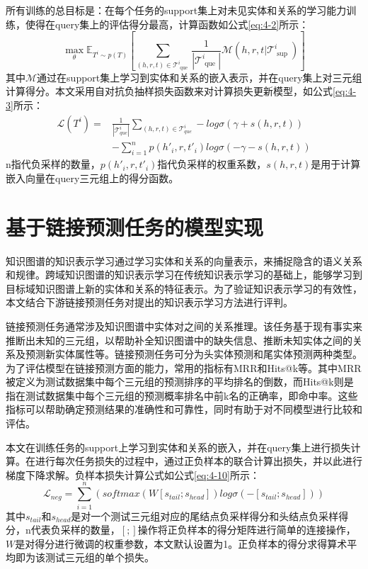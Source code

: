 所有训练的总目标是：在每个任务的support集上对未见实体和关系的学习能力训练，使得在query集上的评估得分最高，计算函数如公式\ref{eq:4-2}所示：
\begin{equation}
  \max\limits_{ \theta } \mathbb{E} _ { T ^ { i } \sim p ( T ) } \left[ \sum\limits_{ ( h , r , t ) \in \mathcal{T} _ { \text { que } } ^ { i } } \frac { 1 } { | \mathcal{T} _ { \text { que } } ^ { i } | } \mathcal{M} ( h , r , t | \mathcal{T} _ { \text { sup } } ^ { i } ) \right] \label{eq:4-2}
\end{equation}
其中\(\mathcal{M}\)通过在support集上学习到实体和关系的嵌入表示，并在query集上对三元组计算得分。本文采用自对抗负抽样损失函数来对计算损失更新模型，如公式\ref{eq:4-3}所示：
\begin{equation}
  \begin{aligned}
    \mathcal{L}(T^{i}) = &\frac{1}{|\mathcal{T}^{i}_{que}|} \sum\limits_{(h,r,t)\in\mathcal{T}^{i}_{que}}-log\sigma(\gamma + s(h,r,t)) \\
    &-\sum\limits_{i=1}^{n}p(h'_{i},r,t'_{i})log\sigma(-\gamma - s(h,r,t)) \label{eq:4-3}
  \end{aligned}
\end{equation}
n指代负采样的数量，\(p(h'_{i},r,t'_{i})\)指代负采样的权重系数，\(s(h,r,t)\)是用于计算嵌入向量在query三元组上的得分函数。

\section{基于链接预测任务的模型实现}
知识图谱的知识表示学习通过学习实体和关系的向量表示，来捕捉隐含的语义关系和规律。跨域知识图谱的知识表示学习在传统知识表示学习的基础上，能够学习到目标域知识图谱上新的实体和关系的特征表示。为了验证知识表示学习的有效性，本文结合下游链接预测任务对提出的知识表示学习方法进行评判。

链接预测任务通常涉及知识图谱中实体对之间的关系推理。该任务基于现有事实来推断出未知的三元组，以帮助补全知识图谱中的缺失信息、推断未知实体之间的关系及预测新实体属性等。链接预测任务可分为头实体预测和尾实体预测两种类型。为了评估模型在链接预测方面的能力，常用的指标有MRR和Hits@k等。其中MRR被定义为测试数据集中每个三元组的预测排序的平均排名的倒数，而Hits@k则是指在测试数据集中每个三元组的预测概率排名中前k名的正确率，即命中率。这些指标可以帮助确定预测结果的准确性和可靠性，同时有助于对不同模型进行比较和评估。

本文在训练任务的support上学习到实体和关系的嵌入，并在query集上进行损失计算。在进行每次任务损失的过程中，通过正负样本的联合计算出损失，并以此进行梯度下降求解。负样本损失计算公式如公式\ref{eq:4-10}所示：
\begin{equation}
  \mathcal{L}_{neg} = \sum_{i = 1}^{n} \left( softmax(W[s_{tail};s_{head}])log \sigma (- [s_{tail};s_{head}]) \right) \label{eq:4-10}
\end{equation}
其中\(s_{tail}\)和\(s_{head}\)是对一个测试三元组对应的尾结点负采样得分和头结点负采样得分，n代表负采样的数量，\([;]\)操作将正负样本的得分矩阵进行简单的连接操作，\(W\)是对得分进行微调的权重参数，本文默认设置为1。正负样本的得分求得算术平均即为该测试三元组的单个损失。

